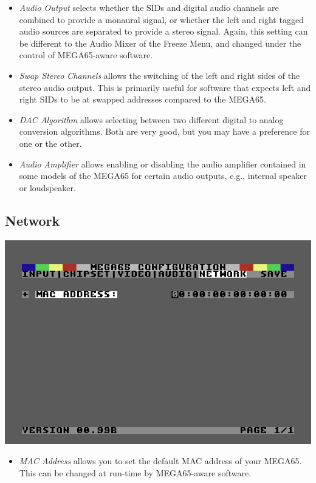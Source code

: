 \begin{itemize}
  \item{\em Audio Output} selects whether the SIDs and digital audio
    channels are combined to provide a monaural signal, or whether
    the left and right tagged audio sources are separated to provide a
    stereo signal. Again, this setting can be different to the Audio
    Mixer of the Freeze Menu, and changed under the control of MEGA65-aware
    software.
  \item{\em Swap Stereo Channels} allows the switching of the left and right
    sides of the stereo audio output. This is primarily useful for
    software that expects left and right SIDs to be at swapped
    addresses compared to the MEGA65.
  \item{\em DAC Algorithm} allows selecting between two different
    digital to analog conversion algorithms.  Both are very good,
    but you may have a preference for one or the other.
  \item{\em Audio Amplifier} allows enabling or disabling the audio
    amplifier contained in some models of the MEGA65 for
    certain audio outputs, e.g., internal speaker or loudspeaker.
\end{itemize}

\subsection{Network}

\includegraphics[width=\linewidth]{images/ss-m65config-5.png}

\begin{itemize}
  \item{\em MAC Address} allows you to set the default MAC address of your
    MEGA65. This can be changed at run-time by MEGA65-aware software.
\end{itemize}
